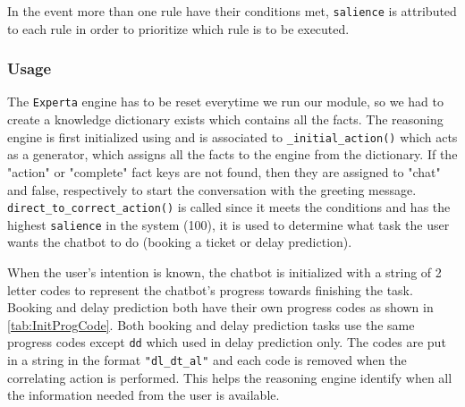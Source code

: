 \documentclass[11pt]{article}
\newcommand{\code}[1]{{\texttt{#1}}}
\begin{document}
        In the event more than one rule have their conditions met, \code{salience} is attributed to each rule in order to prioritize which rule is to be executed.
        
        \subsubsection{Usage}\label{sec:REUsageDesign}
        The \code{Experta} engine has to be reset everytime we run our module, so we had to create a knowledge dictionary exists which contains all the facts. The reasoning engine is first initialized using \code{\@DefFacts} and is associated to \code{\_initial\_action()} which acts as a generator, which assigns all the facts to the engine from the dictionary. If the "action" or "complete" fact keys are not found, then they are assigned to "chat" and false, respectively to start the conversation with the greeting message. \code{direct\_to\_correct\_action()} is called since it meets the conditions and has the highest \code{salience} in the system (100), it is used to determine what task the user wants the chatbot to do (booking a ticket or delay prediction). 
        
        When the user's intention is known, the chatbot is initialized with a string of 2 letter codes to represent the chatbot's progress towards finishing the task. Booking and delay prediction both have their own progress codes as shown in \cref{tab:InitProgCode}. Both booking and delay prediction tasks use the same progress codes except \code{dd} which used in delay prediction only. The codes are put in a string in the format \code{"dl\_dt\_al"} and each code is removed when the correlating action is performed. This helps the reasoning engine identify when all the information needed from the user is available.
        
\end{document}
